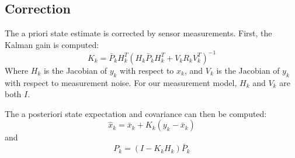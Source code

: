 \documentclass[11pt]{article} %
\begin{document}
\subsection{Correction}

The a priori state estimate is corrected by sensor measurements.  First, the Kalman gain is computed:
\begin{equation}
K_k = \bar{P}_k H_k^T ( H_k \bar{P}_k H_k^T + V_k R_k V_k^T ) ^{-1}
\end{equation}
Where $H_k$ is the Jacobian of $y_k$ with respect to $x_k$, and $V_k$ is the Jacobian of $y_k$ with respect to measurement noise.   For our measurement model, $H_k$ and $V_k$ are both $I$.

The a posteriori state expectation and covariance can then be computed:
\begin{equation}
\hat{x}_k = \bar{x}_k + K_k (y_k - \bar{x}_k)
\end{equation}
and
\begin{equation}
P_k = (I - K_k H_k) \bar{P}_k
\end{equation}
\end{document}
